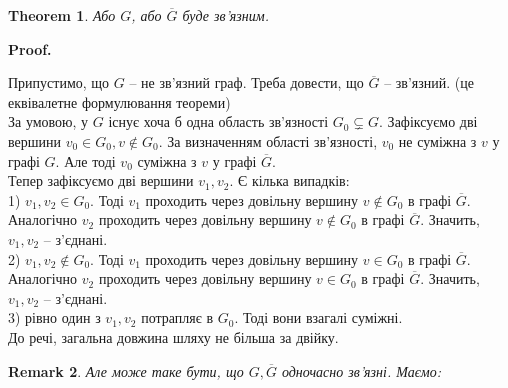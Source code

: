 \documentclass[a4paper, 14pt]{extarticle}
\makeatletter
\theoremstyle{theoremdd}
\newtheorem{theorem}{Theorem}[subsection]
\theoremstyle{theoremdd}
\theoremstyle{theoremdd}
\theoremstyle{theoremdd}
\theoremstyle{theoremdd}
\theoremstyle{theoremdd}
\theoremstyle{theoremdd}
\theoremstyle{theoremdd}
\theoremstyle{theoremdd}
\theoremstyle{theoremdd}
\theoremstyle{theoremdd}
\newtheorem{remark}[theorem]{Remark}
\theoremstyle{theoremdd}
\theoremstyle{theoremdd}
\theoremstyle{theoremdd}
\theoremstyle{theoremdd}
\renewenvironment{proof}[1][Proof.\\]{\par
\pushQED{\hfill \qed}%
\normalfont \topsep6\p@\@plus6\p@\relax
\trivlist
\item\relax
{\bfseries
#1\@addpunct{.}}\hspace\labelsep\ignorespaces
}{%
\popQED\endtrivlist\@endpefalse
}
\makeatother
\begin{document}
\begin{theorem}
Або $G$, або $\overline{G}$ буде зв'язним.
\end{theorem}

\begin{proof}
Припустимо, що $G$ -- не зв'язний граф. Треба довести, що $\overline{G}$ -- зв'язний. (це еквівалетне формулювання теореми)\\
За умовою, у $G$ існує хоча б одна область зв'язності $G_0 \subsetneq G$. Зафіксуємо дві вершини $v_0 \in G_0, v \notin G_0$. За визначенням області зв'язності, $v_0$ не суміжна з $v$ у графі $G$. Але тоді $v_0$ суміжна з $v$ у графі $\overline{G}$.\\
Тепер зафіксуємо дві вершини $v_1,v_2$. Є кілька випадків:\\
1) $v_1,v_2 \in G_0$. Тоді $v_1$ проходить через довільну вершину $v \notin G_0$  в графі $\overline{G}$. Аналогічно $v_2$ проходить через довільну вершину $v \notin G_0$  в графі $\overline{G}$. Значить, $v_1,v_2$ -- з'єднані.\\
2) $v_1,v_2 \notin G_0$. Тоді $v_1$ проходить через довільну вершину $v \in G_0$  в графі $\overline{G}$. Аналогічно $v_2$ проходить через довільну вершину $v \in G_0$  в графі $\overline{G}$. Значить, $v_1,v_2$ -- з'єднані.\\
3) рівно один з $v_1,v_2$ потрапляє в $G_0$. Тоді вони взагалі суміжні.\\
До речі, загальна довжина шляху не більша за двійку.
\end{proof}

\begin{remark}
Але може таке бути, що $G,\overline{G}$ одночасно зв'язні. Маємо:
\begin{figure}[H]
\centering
{}
\qquad
{}
\end{figure}
\end{remark}
\end{document}

